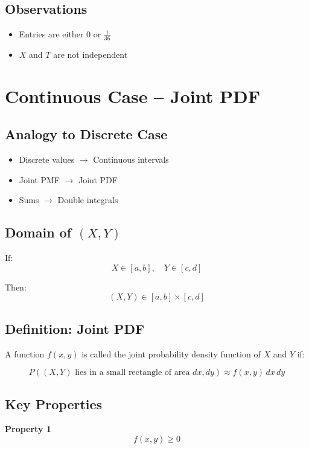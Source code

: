 \documentclass[12pt]{article}
\begin{document}
\subsection{Observations}

\begin{itemize}
\item Entries are either $0$ or $\frac{1}{36}$
\item $X$ and $T$ are not independent
\end{itemize}

\section{Continuous Case -- Joint PDF}

\subsection{Analogy to Discrete Case}

\begin{itemize}
\item Discrete values $\rightarrow$ Continuous intervals
\item Joint PMF $\rightarrow$ Joint PDF
\item Sums $\rightarrow$ Double integrals
\end{itemize}

\subsection{Domain of $(X,Y)$}

If:
\[
X \in [a,b], \quad Y \in [c,d]
\]

Then:
\[
(X,Y) \in [a,b] \times [c,d]
\]

\subsection{Definition: Joint PDF}

A function $f(x,y)$ is called the joint probability density function of $X$ and $Y$ if:

\[
P((X,Y)\text{ lies in a small rectangle of area } dx,dy) \approx f(x,y)\,dx\,dy
\]

\subsection{Key Properties}

\textbf{Property 1}
\[
f(x,y) \ge 0
\]
\end{document}
